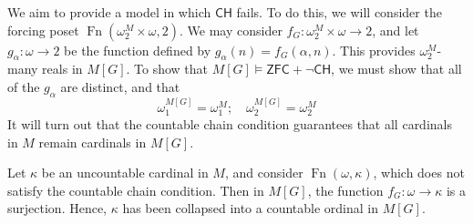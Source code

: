 We aim to provide a model in which \( \mathsf{CH} \) fails.
To do this, we will consider the forcing poset \( \operatorname{Fn}(\omega_2^M \times \omega, 2) \).
We may consider \( f_G : \omega_2^M \times \omega \to 2 \), and let \( g_\alpha : \omega \to 2 \) be the function defined by \( g_\alpha(n) = f_G(\alpha, n) \).
This provides \( \omega_2^M \)-many reals in \( M[G] \).
To show that \( M[G] \vDash \mathsf{ZFC} + \neg\mathsf{CH} \), we must show that all of the \( g_\alpha \) are distinct, and that
\[ \omega_1^{M[G]} = \omega_1^M;\quad \omega_2^{M[G]} = \omega_2^M \]
It will turn out that the countable chain condition guarantees that all cardinals in \( M \) remain cardinals in \( M[G] \).
\begin{example}
    Let \( \kappa \) be an uncountable cardinal in \( M \), and consider \( \operatorname{Fn}(\omega, \kappa) \), which does not satisfy the countable chain condition.
    Then in \( M[G] \), the function \( f_G : \omega \to \kappa \) is a surjection.
    Hence, \( \kappa \) has been collapsed into a countable ordinal in \( M[G] \).
\end{example}
